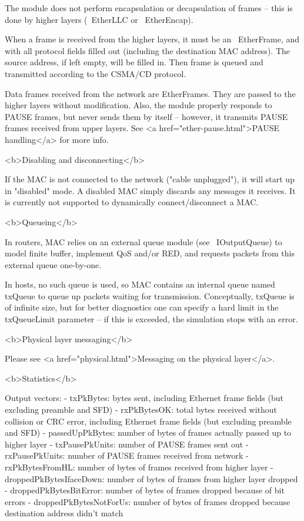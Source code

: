 The module does not perform encapsulation or decapsulation of frames --
this is done by higher layers (~EtherLLC or ~EtherEncap).

When a frame is received from the higher layers, it must be an ~EtherFrame,
and with all protocol fields filled out
(including the destination MAC address). The source address, if left empty,
will be filled in. Then frame is queued and transmitted according
to the CSMA/CD protocol.

Data frames received from the network are EtherFrames. They are passed to
the higher layers without modification.
Also, the module properly responds to PAUSE frames, but never sends them
by itself -- however, it transmits PAUSE frames received from upper layers.
See <a href="ether-pause.html">PAUSE handling</a> for more info.

<b>Disabling and disconnecting</b>

If the MAC is not connected to the network ("cable unplugged"), it will
start up in "disabled" mode. A disabled MAC simply discards any messages
it receives. It is currently not supported to dynamically connect/disconnect
a MAC.


<b>Queueing</b>

In routers, MAC relies on an external queue module (see ~IOutputQueue)
to model finite buffer, implement QoS and/or RED, and requests packets
from this external queue one-by-one.

In hosts, no such queue is used, so MAC contains an internal
queue named txQueue to queue up packets waiting for transmission.
Conceptually, txQueue is of infinite size, but for better diagnostics
one can specify a hard limit in the txQueueLimit parameter -- if this is
exceeded, the simulation stops with an error.


<b>Physical layer messaging</b>

Please see <a href="physical.html">Messaging on the physical layer</a>.

<b>Statistics</b>

Output vectors:
- txPkBytes: bytes sent, including Ethernet frame fields (but excluding preamble and SFD)
- rxPkBytesOK: total bytes received  without collision or CRC error,
  including Ethernet frame fields (but excluding preamble and SFD)
- passedUpPkBytes: number of bytes of frames actually passed up to higher layer
- txPausePkUnits: number of PAUSE frames sent out
- rxPausePkUnits: number of PAUSE frames received from network
- rxPkBytesFromHL: number of bytes of frames received from higher layer
- droppedPkBytesIfaceDown: number of bytes of frames from higher layer dropped
- droppedPkBytesBitError: number of bytes of frames dropped because of bit errors
- droppedPkBytesNotForUs: number of bytes of frames dropped because destination address didn't match

